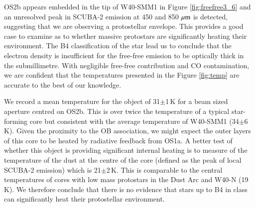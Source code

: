 OS2b appears embedded in the tip of W40-SMM1 in Figure \ref{fig:freefree3_6} and an unresolved peak 
in SCUBA-2 emission at 450 and 850\,$\,\mu\rm{m}$ is detected, suggesting that we are observing a protostellar 
envelope. This provides a good case to examine as to whether massive protostars are significantly heating 
their environment. The B4 classification of the star lead us to conclude that the electron density is insufficient 
for the free-free emission to be optically thick in the submillimetre. With negligible free-free contribution and 
CO contamination, we are confident that the temperatures presented in the Figure \ref{fig:temp} are accurate 
to the best of our knowledge. 

We record a mean temperature for the object of 31$\pm$1\,K for a beam sized aperture centred on OS2b. 
This is over twice the temperature of a typical star-forming core but consistent with the average temperature 
of W40-SMM1 (34$\pm$6\,K). Given the proximity to the OB association, we might expect the outer layers of 
this core to be heated by radiative feedback from OS1a. A better test of whether this object is providing 
significant internal heating is to measure of the temperature of the dust at the centre of the core (defined as 
the peak of local SCUBA-2 emission) which is 21$\pm$2\,K. This is comparable to the central temperatures 
of cores with low mass protostars in the Dust Arc and W40-N (19\,K). We therefore conclude that there is 
no evidence that stars up to B4 in class can significantly heat their protostellar environment. 



